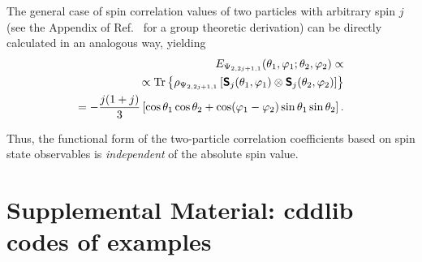 \documentclass[%
  twocolumn,
 showpacs,
 showkeys,
 preprintnumbers,
 amsmath,amssymb,
 aps,
  pra,
  longbibliography,
 floatfix,
 ]{revtex4-1}
\begin{document}
The general case of spin correlation values of two particles with arbitrary spin $j$
(see the Appendix of Ref.~\cite{svozil-krenn} for a group theoretic derivation) can be directly
calculated in an analogous way, yielding
\begin{equation}
\begin{split}
E_{{ \Psi_{2,2j+1,1}}} (\theta_1,\varphi_1;\theta_2,\varphi_2 )
\propto
\\   \propto
{\rm Tr}\left\{ \rho_{ \Psi_{2,2j+1,1}}   \left[ \textsf{\textbf{S}}_{j}(\theta_1,\varphi_1) \otimes \textsf{\textbf{S}}_{j}(\theta_2,\varphi_2)\right]\right\} \\
= -\frac{j(1+j)}{3} \left[\cos \theta_1 \cos \theta_2 + \cos (\varphi_1 - \varphi_2) \sin \theta_1 \sin \theta_2\right]  .
\end{split}
\label{2009-gtq-edosgcjj}
\end{equation}

Thus, the functional form of the two-particle correlation coefficients based on spin state observables is {\em
independent} of the absolute spin value.

 
 



\newif\ifsupincl
\supincltrue
\ifsupincl

\pagebreak

\section{Supplemental Material: cddlib codes of examples}
\label{2017-b-ccoe}



\fi
\end{document}
